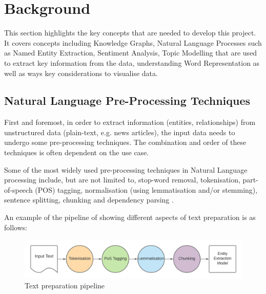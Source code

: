\chapter{Background}

This section highlights the key concepts that are needed to develop this project. It covers concepts including Knowledge Graphs, Natural Language Processes such as Named Entity Extraction, Sentiment Analysis, Topic Modelling that are used to extract key information from the data, understanding Word Representation as well as ways key considerations to visualise data. 


\section{Natural Language Pre-Processing Techniques}

First and foremost, in order to extract information (entities, relationships) from unstructured data (plain-text, e.g. news articles), the input data needs to undergo some pre-processing techniques. The combination and order of these techniques is often dependent on the use case.

Some of the most widely used pre-processing techniques in Natural Language processing include, but are not limited to, stop-word removal, tokenisation, part-of-speech (POS) tagging, normalisation (using lemmatisation and/or stemming), sentence splitting, chunking
and dependency parsing \cite{kannan2014preprocessing} \cite{ieee_named_entity}.

An example of the pipeline of showing different aspects of text preparation is as follows:

\begin{figure}[H]
\centering
\includegraphics[scale=0.15]{images/sentence chaining}
\caption{Text preparation pipeline}
\end{figure}

